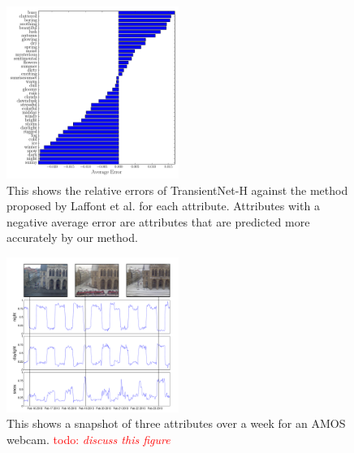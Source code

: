 \documentclass[10pt,twocolumn,letterpaper]{article}
\newcommand{\todo}[1]{\textcolor{red}{todo: {\em #1}}}
\begin{document}
\begin{figure}[t!]
	\centering
		\includegraphics[width=0.5\textwidth]{figs/rel_err_cmr.pdf}
		\caption{This shows the relative errors of TransientNet-H against the method 
						 proposed by Laffont et al. for each attribute.  Attributes with a 
						 negative average error are attributes that are predicted more 
						 accurately by our method.}
		\label{fig:relerr}
\end{figure}

\begin{figure}[t]
	\centering
		\includegraphics[width=0.5\textwidth]{figs/attr_compare.pdf}
		\caption{This shows a snapshot of three attributes over a week for an AMOS
             webcam. \todo{discuss this figure}}
		\label{fig:attrcmp}
\end{figure}
\end{document}
